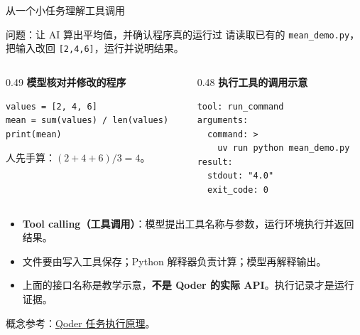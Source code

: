\documentclass[9pt]{ctexbeamer}
\begin{document}
\begin{frame}[fragile]{从一个小任务理解工具调用}
  \begin{block}{问题：让 AI 算出平均值，并确认程序真的运行过}
    请读取已有的 \texttt{mean\_demo.py}，把输入改回 \texttt{[2,4,6]}，运行并说明结果。
  \end{block}
  \begin{columns}[T,totalwidth=\textwidth]
    \begin{column}{0.49\textwidth}
      \textbf{模型核对并修改的程序}
\begin{lstlisting}[numbers=none]
values = [2, 4, 6]
mean = sum(values) / len(values)
print(mean)
\end{lstlisting}
      \small 人先手算：$(2+4+6)/3=4$。
    \end{column}
    \begin{column}{0.48\textwidth}
      \textbf{执行工具的调用示意}
\begin{lstlisting}[language={},numbers=none]
tool: run_command
arguments:
  command: >
    uv run python mean_demo.py
result:
  stdout: "4.0"
  exit_code: 0
\end{lstlisting}
    \end{column}
  \end{columns}
  \begin{itemize}
    \item \textbf{Tool calling（工具调用）}：模型提出工具名称与参数，运行环境执行并返回结果。
    \item 文件要由写入工具保存；Python 解释器负责计算；模型再解释输出。
    \item 上面的接口名称是教学示意，\textbf{不是 Qoder 的实际 API}。执行记录才是运行证据。
  \end{itemize}
  {\tiny 概念参考：\href{https://docs.qoder.cn/cli/how-it-works}{Qoder 任务执行原理}。}
\end{frame}
\end{document}
